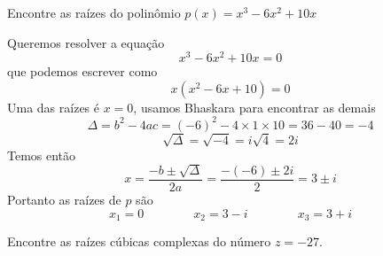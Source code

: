 \documentclass[a4paper,12pt,fleqn]{article}
\begin{document}
Encontre as raízes do polinômio \(p(x) = x^3 -6x^2 + 10x\)

\begin{answer}
  Queremos resolver a equação
  \[
    x^3 -6x^2 + 10x = 0
  \]
  que podemos escrever como
  \[
    x\left(x^2 -6x + 10\right) = 0
  \]
  Uma das raízes é \(x=0\), usamos Bhaskara para encontrar as demais
  \[
    \Delta
    = b^2 - 4ac
    = (-6)^2 - 4 \times 1 \times 10
    = 36 - 40
    = -4
  \]
  \[
    \sqrt{\Delta}
    = \sqrt{-4}
    = i\sqrt{4}
    = 2i
  \]
  Temos então
  \[
    x
    = \frac{-b\pm\sqrt{\Delta}}{2a}
    = \frac{-(-6)\pm 2i}{2}
    = 3\pm i
  \]
  Portanto as raízes de $p$ são
  \[
    x_1 = 0 \qquad\qquad
    x_2 = 3-i \qquad\qquad
    x_3 = 3+i
  \]
  \clearpage
\end{answer}

Encontre as raízes cúbicas complexas do número \( z = -27 \).
\end{document}
